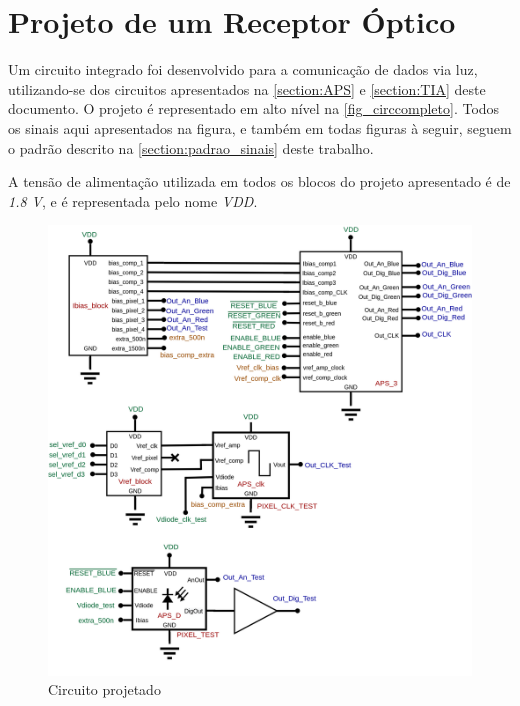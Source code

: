 \section[Projeto de um Receptor Óptico]{Projeto de um Receptor Óptico}
\label{sec_circ_comp}

Um circuito integrado foi desenvolvido para a comunicação de dados via luz, utilizando-se dos circuitos apresentados na \autoref{section:APS} e \autoref{section:TIA} deste documento. O projeto \'e representado em alto n\'ivel na \autoref{fig_circcompleto}. Todos os sinais aqui apresentados na figura, e tamb\'em em todas figuras \`a seguir, seguem o padrão descrito na \autoref{section:padrao_sinais} deste trabalho.

A tensão de alimentação utilizada em todos os blocos do projeto apresentado é de \textit{1.8 V}, e é representada pelo nome \textit{VDD}.

\begin{figure}[htb]
	\caption{\label{fig_circcompleto}Circuito projetado}
	\begin{center}
	    \includegraphics[width=\textwidth]{Circuitos/Complete_Circuit.png}
	\end{center}
\end{figure}

